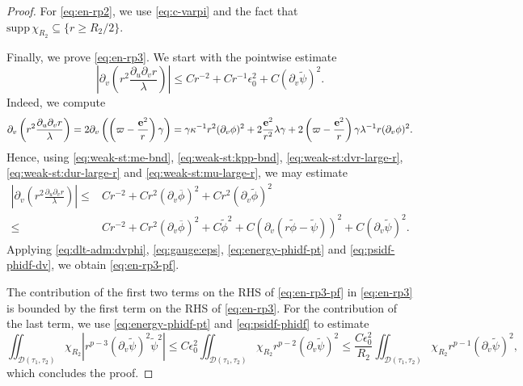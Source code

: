 \documentclass[10pt, reqno]{amsart}
\theoremstyle{definition}
\theoremstyle{remark}
\theoremstyle{conjecture}
\numberwithin{equation}{section}
\newcommand{\set}[1]{\{#1\}}
\newcommand{\rd}{\partial}
\newcommand{\0}{\emptyset}
\newcommand{\gmm}{\gamma}
\newcommand{\dlt}{\delta}
\newcommand{\eps}{\epsilon}
\newcommand{\kpp}{\kappa}
\newcommand{\lmb}{\lambda}
\newcommand{\bfe}{{\bf e}}
\newcommand{\calD}{\mathcal D}
\newcommand{\dvr}{\lmb}
\newcommand{\e}{\bfe}							%
\newcommand{\phibg}{\overline{\phi}}				%
\newcommand{\psibg}{\overline{\psi}}				%
\newcommand{\phidf}{\widetilde{\phi}}				%
\newcommand{\psidf}{\widetilde{\psi}}				%
\newcommand{\Abs}[1]{\left\vert #1 \right\vert}
\begin{document}
\begin{proof}
For \eqref{eq:en-rp2}, we use \eqref{eq:c-varpi} and the fact that $\mathrm{supp} \, \chi_{R_{2}} \subseteq \set{r \geq R_{2} / 2}$.

Finally, we prove \eqref{eq:en-rp3}. We start with the pointwise estimate
\begin{equation}  \label{eq:en-rp3-pf}
\Abs{\rd_{v} \left( r^{2} \frac{\rd_{u} \rd_{v} r}{\dvr} \right)} 
\leq C r^{-2}  + C r^{-1} \eps_{0}^{2} + C (\rd_{v} \psidf)^{2}.
\end{equation}
Indeed, we compute
\begin{align*}
\rd_{v} \left( r^{2} \frac{\rd_{u} \rd_{v} r}{\dvr} \right)
= 2 \rd_{v} \left( \left( \varpi - \frac{\e^{2}}{r} \right) \gmm \right)
=  \gmm \kpp^{-1} r^{2} (\rd_{v} \phi)^{2} 
+ 2 \frac{\e^{2}}{r^{2}} \dvr \gmm + 2 \left( \varpi - \frac{\e^{2}}{r} \right) \gmm \dvr^{-1} r (\rd_{v} \phi)^{2}.
\end{align*}
Hence, using \eqref{eq:weak-st:me-bnd}, \eqref{eq:weak-st:kpp-bnd}, \eqref{eq:weak-st:dvr-large-r}, \eqref{eq:weak-st:dur-large-r} and \eqref{eq:weak-st:mu-large-r}, we may estimate
\begin{align*}
	\Abs{\rd_{v} \left( r^{2} \frac{\rd_{u} \rd_{v} r}{\dvr} \right)} 
	\leq & C r^{-2} + C r^{2} (\rd_{v} \phibg)^{2} + C r^{2} (\rd_{v} \phidf)^{2} \\
	\leq & C r^{-2} + C r^{2} (\rd_{v} \phibg)^{2} + C \phidf^{2} + C (\rd_{v} (r \phidf - \psidf) )^{2} + C (\rd_{v} \psidf )^{2} .
\end{align*}
Applying \eqref{eq:dlt-adm:dvphi}, \eqref{eq:gauge:eps}, \eqref{eq:energy-phidf-pt} and \eqref{eq:psidf-phidf-dv}, we obtain \eqref{eq:en-rp3-pf}.

The contribution of the first two terms on the RHS of \eqref{eq:en-rp3-pf} in \eqref{eq:en-rp3} is bounded by the first term on the RHS of \eqref{eq:en-rp3}. For the contribution of the last term, we use \eqref{eq:energy-phidf-pt} and \eqref{eq:psidf-phidf} to estimate
\begin{equation*}
	\iint_{\calD (\tau_{1}, \tau_{2})} \chi_{R_{2}} \Abs{r^{p-3} (\rd_{v} \psidf)^{2} \psidf^{2} } 
\leq 	C \eps_{0}^{2} \iint_{\calD (\tau_{1}, \tau_{2})} \chi_{R_{2}} r^{p-2} (\rd_{v} \psidf)^{2}
\leq 	\frac{C \eps_{0}^{2}}{R_{2}} \iint_{\calD (\tau_{1}, \tau_{2})} \chi_{R_{2}} r^{p-1} (\rd_{v} \psidf)^{2},
\end{equation*}
which concludes the proof. \qedhere
\end{proof}
\end{document}
